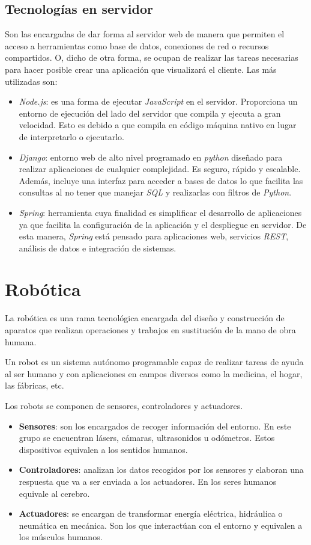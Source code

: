 \subsection{Tecnologías en servidor}
\label{subsec:tecserver}
Son las encargadas de dar forma al servidor web de manera que permiten el acceso a herramientas como base de datos, conexiones de red o recursos compartidos. O, dicho de otra forma, se ocupan de realizar las tareas necesarias para hacer posible crear una aplicación que visualizará el cliente. Las más utilizadas son: 
\begin{itemize}
    \item \textit{Node.js}: es una forma de ejecutar \textit{JavaScript} en el servidor. Proporciona un entorno de ejecución del lado del servidor que compila y ejecuta a gran velocidad. Esto es debido a que compila en código máquina nativo en lugar de interpretarlo o ejecutarlo.   
    \item \textit{Django}: entorno web de alto nivel programado en \textit{python} diseñado para realizar aplicaciones de cualquier complejidad. Es seguro, rápido y escalable. Además, incluye una interfaz para acceder a bases de datos lo que facilita las consultas al no tener que manejar \textit{SQL} y realizarlas con filtros de \textit{Python}.
    \item \textit{Spring}: herramienta cuya finalidad es simplificar el desarrollo de aplicaciones ya que facilita la configuración de la aplicación y el despliegue en servidor. De esta manera, \textit{Spring} está pensado para aplicaciones web, servicios \textit{REST}, análisis de datos e integración de sistemas. 
\end{itemize}

\section{Robótica}
\label{sec:robotica}
La robótica es una rama tecnológica encargada del diseño y construcción de aparatos que realizan operaciones y trabajos en sustitución de la mano de obra humana. 

Un robot es un sistema autónomo programable capaz de realizar tareas de ayuda al ser humano y con aplicaciones en campos diversos como la medicina, el hogar, las fábricas, etc. 

Los robots se componen de sensores, controladores y actuadores.
\begin{itemize}
    \item \textbf{Sensores}: son los encargados de recoger información del entorno. En este grupo se encuentran lásers, cámaras, ultrasonidos u odómetros. Estos dispositivos equivalen a los sentidos humanos. 
    \item \textbf{Controladores}: analizan los datos recogidos por los sensores y elaboran una respuesta que va a ser enviada a los actuadores. En los seres humanos equivale al cerebro. 
    \item \textbf{Actuadores}: se encargan de transformar energía eléctrica, hidráulica o neumática en mecánica. Son los que interactúan con el entorno y equivalen a los músculos humanos. 
\end{itemize}


